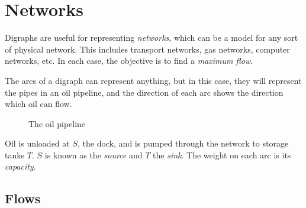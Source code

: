 \section*{Networks}

Digraphs are useful for representing \textit{networks}, which can be a model for any sort of physical network. This
 includes transport networks, gas networks, computer networks, etc. In each case, the objective is to find a
 \textit{maximum flow}.

The arcs of a digraph can represent anything, but in this case, they will represent the pipes in an oil pipeline, and
 the direction of each arc shows the direction which oil can flow.

\begin{minipage}[c]{0.45\linewidth}
  \begin{figure}[H]
    \centering
    \usetikzlibrary{graphs}
    \caption{The oil pipeline}
    \label{fig:network1}
  \end{figure}
\end{minipage}\hfill
\begin{minipage}[c]{0.45\linewidth}
  Oil is unloaded at $S$, the dock, and is pumped through the network to storage tanks $T$. $S$ is known as the \textit{source}
   and $T$ the \textit{sink}. The weight on each arc is its \textit{capacity}.
\end{minipage}

\subsection*{Flows}

